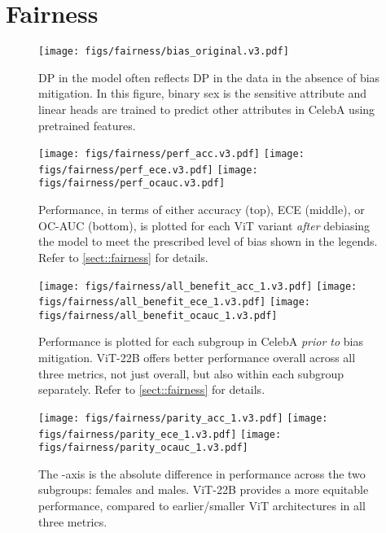 \documentclass{article}
\newcommand{\chonk}{\mbox{ViT-22B}\xspace}
\begin{document}
 \section{Fairness}\label{app:fairness}
\newlength{\fairnessfigurewidth}\setlength{\fairnessfigurewidth}{0.6\columnwidth}

\begin{figure}[htbp]
    \centering
\texttt{[image: figs/fairness/bias\_original.v3.pdf]}
    \vspace{-10pt}
    \caption{DP in the model often reflects DP in the data in the absence of bias mitigation. In this figure, binary sex is the sensitive attribute and linear heads are trained to predict other attributes in CelebA using pretrained features.
}
    \label{fig:fairness:bias_original}
    \vspace{-10pt}
\end{figure}

\begin{figure}[htbp]
    \centering
    \texttt{[image: figs/fairness/perf\_acc.v3.pdf]}
    \texttt{[image: figs/fairness/perf\_ece.v3.pdf]}
    \texttt{[image: figs/fairness/perf\_ocauc.v3.pdf]}\vspace{-1em}
    \caption{Performance, in terms of either accuracy (top),  ECE (middle), or OC-AUC (bottom), is plotted for each ViT variant \emph{after} debiasing the model to meet the prescribed level of bias shown in the legends. Refer to \cref{sect::fairness} for details.}
    \label{fig:fairness:perf}
\end{figure}


\begin{figure}[htbp]
    \centering
    \texttt{[image: figs/fairness/all\_benefit\_acc\_1.v3.pdf]}
    \texttt{[image: figs/fairness/all\_benefit\_ece\_1.v3.pdf]}
    \texttt{[image: figs/fairness/all\_benefit\_ocauc\_1.v3.pdf]}\vspace{-1em}
    \caption{Performance is plotted for each subgroup in CelebA \emph{prior to} bias mitigation. \chonk offers better performance overall across all three metrics, not just overall, but also within each subgroup separately. Refer to \cref{sect::fairness} for details.}
    \label{fig:fairness:allbenefit}
\end{figure}


\begin{figure}[htbp]
    \centering
    \texttt{[image: figs/fairness/parity\_acc\_1.v3.pdf]}
    \texttt{[image: figs/fairness/parity\_ece\_1.v3.pdf]}
    \texttt{[image: figs/fairness/parity\_ocauc\_1.v3.pdf]}\vspace{-1em}
    \caption{The -axis is the absolute difference in performance across the two subgroups: females and males. \chonk provides a more equitable performance, compared to earlier/smaller ViT architectures in all three metrics.}
    \label{fig:fairness:parity}
\end{figure}
\end{document}
